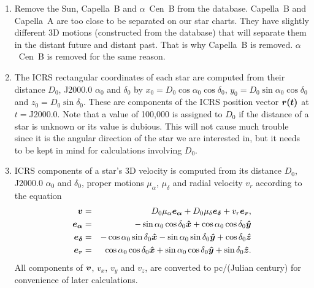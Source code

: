 \documentclass[12pt]{article}
\newcommand \beqn {\begin{eqnarray}}
\newcommand \eeqn {\end{eqnarray}}
\newcommand{\ve}[1]{\mbox{\boldmath $#1$}}
\begin{document}
\begin{enumerate}
\item Remove the Sun, Capella~B and $\alpha$~Cen~B from the database. 
Capella~B and Capella~A are too close to be separated on our star charts. 
They have slightly different 3D motions (constructed from the database) that 
will separate them in the distant future and distant past. That is why Capella~B 
is removed. $\alpha$~Cen~B is removed for the same reason. 

\item The ICRS rectangular coordinates of each star are computed from their 
distance $D_0$, J2000.0 $\alpha_0$ and $\delta_0$ by 
$x_0=D_0 \cos \alpha_0 \cos \delta_0$, $y_0=D_0\sin \alpha_0 \cos \delta_0$ and 
$z_0=D_0 \sin \delta_0$. These are components of the ICRS position vector 
$\ve{r(t)}$ at $t=$J2000.0. 
Note that a value of 100,000 is assigned to $D_0$ if the distance of 
a star is unknown or its value is dubious. This will not cause 
much trouble since it is the angular direction of the star we 
are interested in, but it needs to be kept in mind for calculations 
involving $D_0$.

\item ICRS components of a star's 3D velocity is computed 
from its distance $D_0$, J2000.0 $\alpha_0$ and $\delta_0$, proper 
motions $\mu_{\alpha}$, $\mu_{\delta}$ and radial velocity $v_r$ according 
to the equation 
\beqn
  \ve{v} &=& D_0 \mu_{\alpha} \ve{e_{\alpha}} + D_0\mu_{\delta} \ve{e_{\delta}}  
+ v_r \ve{e_r} , \\ 
  \ve{e_{\alpha}} &=& -\sin \alpha_0 \cos \delta_0 \ve{\hat{x}} + \cos \alpha_0 \cos \delta_0\ve{\hat{y}} \\ 
  \ve{e_{\delta}} &=& -\cos \alpha_0 \sin \delta_0 \ve{\hat{x}} 
-\sin \alpha_0 \sin \delta_0 \ve{\hat{y}} + \cos \delta_0 \ve{\hat{z}} \\ 
  \ve{e_r} &=& \cos \alpha_0 \cos \delta_0 \ve{\hat{x}} 
+ \sin \alpha_0 \cos \delta_0 \ve{\hat{y}} + \sin \delta_0 \ve{\hat{z}} .
\eeqn
All components of $\ve{v}$, $v_x$, $v_y$ and $v_z$, are converted 
to pc/(Julian century) for convenience of later calculations.


\end{enumerate}
\end{document}
